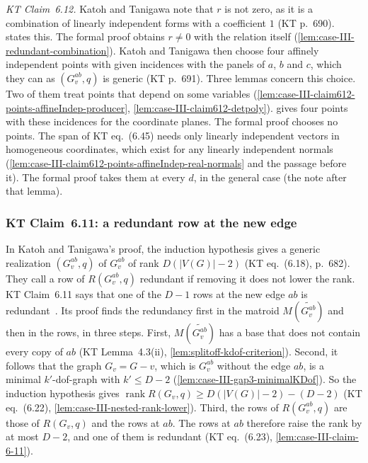 \begin{remark}
  \emph{KT Claim~6.12.} Katoh and Tanigawa note that $r$ is not zero, as
  it is a combination of linearly independent forms with a coefficient
  $1$ (KT p.~690).  states this.
  The formal proof obtains $r \neq 0$ with the relation itself
  (\cref{lem:case-III-redundant-combination}). Katoh and Tanigawa then
  choose four affinely independent points with given incidences with
  the panels of $a$, $b$ and $c$, which they can as $(G_v^{ab}, q)$ is
  generic (KT p.~691). Three lemmas concern this choice. Two of them
  treat points that depend on some variables
  (\cref{lem:case-III-claim612-points-affineIndep-producer},
  \cref{lem:case-III-claim612-detpoly}).
   gives four points with
  these incidences for the coordinate planes. The formal proof chooses
  no points. The span of KT eq.~(6.45) needs only linearly independent
  vectors in homogeneous coordinates, which exist for any linearly
  independent normals
  (\cref{lem:case-III-claim612-points-affineIndep-real-normals} and the
  passage before it). The formal proof takes them at every $d$, in the
  general case (the note after that lemma).
\end{remark}

\subsubsection{KT Claim~6.11: a redundant row at the new edge}

In Katoh and Tanigawa's proof, the induction hypothesis gives a generic
realization $(G_v^{ab}, q)$ of $G_v^{ab}$ of rank $D(|V(G)| - 2)$ (KT
eq.~(6.18), p.~682). They call a row of $R(G_v^{ab}, q)$ redundant if
removing it does not lower the rank. KT Claim~6.11 says that one of the
$D - 1$ rows at the new edge $ab$ is
redundant~\cite[p.~684]{katohTanigawa2011}. Its proof finds the
redundancy first in the matroid $M(\widetilde{G_v^{ab}})$ and then in
the rows, in three steps. First, $M(\widetilde{G_v^{ab}})$ has a base
that does not contain every copy of $ab$ (KT Lemma~4.3(ii),
\cref{lem:splitoff-kdof-criterion}). Second, it follows that the
graph $G_v = G - v$, which is $G_v^{ab}$ without the edge $ab$, is a
minimal $k'$-dof-graph with $k' \le D - 2$
(\cref{lem:case-III-gap3-minimalKDof}). So the induction hypothesis
gives $\operatorname{rank} R(G_v, q) \ge D(|V(G)| - 2) - (D - 2)$ (KT
eq.~(6.22), \cref{lem:case-III-nested-rank-lower}). Third, the rows of
$R(G_v^{ab}, q)$ are those of $R(G_v, q)$ and the rows at $ab$. The rows
at $ab$ therefore raise the rank by at most $D - 2$, and one of them is
redundant (KT eq.~(6.23), \cref{lem:case-III-claim-6-11}).

